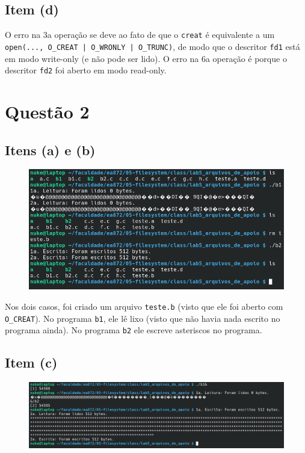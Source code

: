 \documentclass{article}
\begin{document}
\subsection*{Item (d)}


O erro na 3a operação se deve ao fato de que o \texttt{creat} é equivalente a um \texttt{open(..., O\_CREAT | O\_WRONLY | O\_TRUNC)}, de modo que o descritor \texttt{fd1} está em modo write-only (e não pode ser lido). O erro na 6a operação é porque o descritor \texttt{fd2} foi aberto em modo read-only.

\section*{Questão 2}

\subsection*{Itens (a) e (b)}

\begin{figure}[!ht]
    \begin{center}
        \includegraphics[width=\textwidth]{images/questao_2_ab.png}
    \end{center}
\end{figure} 

Nos dois casos, foi criado um arquivo \texttt{teste.b} (visto que ele foi aberto com \texttt{O\_CREAT}). No programa \texttt{b1}, ele lê lixo (visto que não havia nada escrito no programa ainda). No programa \texttt{b2} ele escreve asteriscos no programa.

\newpage
\subsection*{Item (c)}

\begin{figure}[!ht]
    \begin{center}
        \includegraphics[width=\textwidth]{images/questao_2_c.png}
    \end{center}
\end{figure} 
\FloatBarrier
\end{document}
